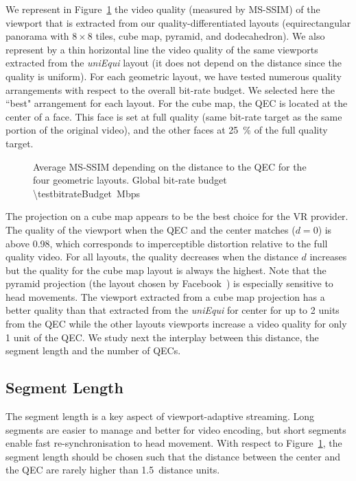We represent in Figure~\ref{fig:dist_quality} the video quality
(measured by \acs{MS-SSIM}) of the viewport that is extracted from our
quality-differentiated layouts (equirectangular panorama with
$8\!\times\! 8$ tiles, cube map, pyramid, and dodecahedron). We also
represent by a thin horizontal line the video quality of the same
viewports extracted from the \textit{uniEqui} layout (it does
not depend on the distance since the quality is uniform). For each
geometric layout, we have tested numerous quality arrangements with
respect to the overall bit-rate budget. We selected here the ``best"
arrangement for each layout. For the cube map,
the
\ac{QEC} is located at the center of a face. This face is set at full
quality (same bit-rate target as the same portion of the original
video), and the other faces at \SI{25}{\percent} of the
full quality target.

\begin{figure}
    
       \caption{Average \acs{MS-SSIM} depending on the distance to the \acs{QEC} for the four geometric layouts. Global bit-rate budget \SI{\testbitrateBudget}{\mega bps}}
    \label{fig:dist_quality}
\end{figure}

The projection on a cube map appears to be the best choice for the
\ac{VR} provider. The quality of the viewport when the \ac{QEC} and
the \FoV{} center matches ($d=0$) is above \num{0.98}, which
corresponds to imperceptible distortion relative to the full quality
video. For all layouts, the quality decreases when the distance $d$
increases but the quality for the cube map layout is always the
highest. Note that the pyramid projection (the layout chosen
by Facebook~\cite{facebook}) is especially sensitive to head movements.
The viewport extracted from a cube map projection has a better quality
than that extracted from the \emph{uniEqui} for \FoV{} center for up to
\num{2} units from the \ac{QEC} while the other layouts viewports increase a video quality for only \num{1} unit of the \ac{QEC}.
We study next the interplay between this distance, the segment length and the number of \acp{QEC}.

\subsection{Segment Length}
\label{subsec:segmentLength}

The segment length is a key aspect of viewport-adaptive streaming.
Long segments are easier to manage and better for video encoding, but
short segments enable fast re-synchronisation to head movement. With
respect to Figure~\ref{fig:dist_quality}, the segment length
should be chosen such that the distance between the \FoV{} center and
the \ac{QEC} are rarely higher than \num{1.5}~distance units.

